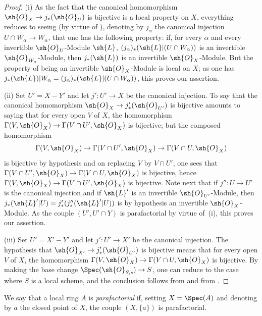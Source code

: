 \begin{proof}
(i) As the fact that the canonical homomorphism $\sh{O}_X\to j_*(\sh{O}_U)$ is bijective is a local property on $X$, everything reduces to seeing (by virtue of ), denoting by $j_\alpha$ the canonical injection $U\cap W_\alpha\to W_\alpha$, that one has the following property: if, for every $\alpha$ and every invertible $\sh{O}_U$-Module $\sh{L}$, $(j_\alpha)_*(\sh{L}|(U\cap W_\alpha))$ is an invertible $\sh{O}_{W_\alpha}$-Module, then $j_*(\sh{L})$ is an invertible $\sh{O}_X$-Module.
But the property of being an invertible $\sh{O}_X$-Module is local on $X$; as one has $j_*(\sh{L})|W_\alpha=(j_\alpha)_*(\sh{L}|(U\cap W_\alpha))$, this proves our assertion.

(ii) Set $U'=X-Y'$ and let $j':U'\to X$ be the canonical injection.
To say that the canonical homomorphism $\sh{O}_X\to j'_*(\sh{O}_{U'})$ is bijective amounts to saying that for every open $V$ of $X$, the homomorphism $\Gamma(V,\sh{O}_X)\to\Gamma(V\cap U',\sh{O}_X)$ is bijective; but the composed homomorphism
\[
  \Gamma(V,\sh{O}_X)\to\Gamma(V\cap U',\sh{O}_X)\to\Gamma(V\cap U,\sh{O}_X)
\]
is bijective by hypothesis  and on replacing $V$ by $V\cap U'$, one sees that $\Gamma(V\cap U',\sh{O}_X)\to\Gamma(V\cap U,\sh{O}_X)$ is bijective, hence $\Gamma(V,\sh{O}_X)\to\Gamma(V\cap U',\sh{O}_X)$ is bijective.
Note next that if $j'':U\to U'$ is the canonical injection and if $\sh{L}'$ is an invertible $\sh{O}_{U'}$-Module, then $j_*(\sh{L}'|U)=j'_*(j''_*(\sh{L}'|U))$ is by hypothesis an invertible $\sh{O}_X$-Module.
As the couple $(U',U'\cap Y)$ is parafactorial by virtue of~(i), this proves our assertion.

(iii) Set $U'=X'-Y'$ and let $j':U'\to X'$ be the canonical injection.
The hypothesis that $\sh{O}_{X'}\to j'_*(\sh{O}_{U'})$ is bijective means that for every open $V$ of $X$, the homomorphism $\Gamma(V,\sh{O}_X)\to\Gamma(V\cap U,\sh{O}_X)$ is bijective.
By making the base change $\Spec(\sh{O}_{S,s})\to S$, one can reduce to the case where $S$ is a local scheme, and the conclusion follows from  and from .
\end{proof}


\begin{definition}[21.13.7]
\label{IV.21.13.7}
We say that a local ring $A$ is \emph{parafactorial} if, setting $X=\Spec(A)$ and denoting by $a$ the closed point of $X$, the couple $(X,\{a\})$ is parafactorial.
\end{definition}


